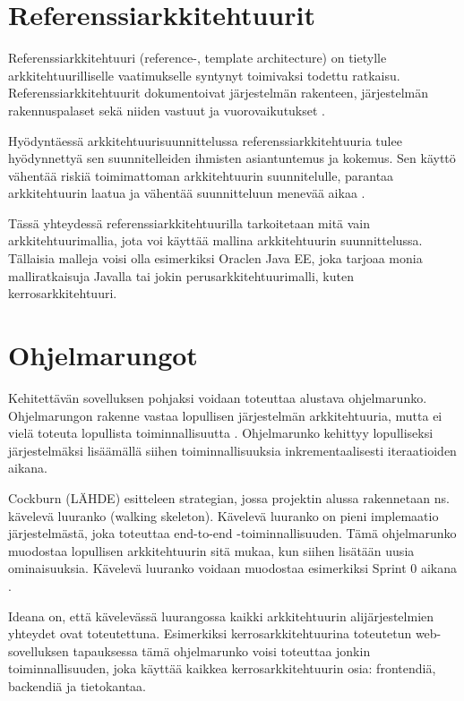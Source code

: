 \section{Referenssiarkkitehtuurit}
Referenssiarkkitehtuuri (reference-, template architecture) on tietylle arkkitehtuurilliselle vaatimukselle syntynyt toimivaksi todettu ratkaisu. Referenssiarkkitehtuurit dokumentoivat järjestelmän rakenteen, järjestelmän rakennuspalaset sekä niiden vastuut ja vuorovaikutukset \citep{vogel2011software}. 

Hyödyntäessä arkkitehtuurisuunnittelussa referenssiarkkitehtuuria tulee hyödynnettyä sen suunnitelleiden ihmisten asiantuntemus ja kokemus. Sen käyttö vähentää riskiä toimimattoman arkkitehtuurin suunnitelulle, parantaa arkkitehtuurin laatua ja vähentää suunnitteluun menevää aikaa \citep{vogel2011software}.

Tässä yhteydessä referenssiarkkitehtuurilla tarkoitetaan mitä vain arkkitehtuurimallia, jota voi käyttää mallina arkkitehtuurin suunnittelussa. Tällaisia malleja voisi olla esimerkiksi Oraclen Java EE, joka tarjoaa monia malliratkaisuja Javalla tai jokin perusarkkitehtuurimalli, kuten kerrosarkkitehtuuri.

\section{Ohjelmarungot}
Kehitettävän sovelluksen pohjaksi voidaan toteuttaa alustava ohjelmarunko. Ohjelmarungon rakenne vastaa lopullisen järjestelmän arkkitehtuuria, mutta ei vielä toteuta lopullista toiminnallisuutta \citep{vogel2011software}. Ohjelmarunko kehittyy lopulliseksi järjestelmäksi lisäämällä siihen toiminnallisuuksia inkrementaalisesti iteraatioiden aikana.

Cockburn (LÄHDE) esitteleen strategian, jossa projektin alussa rakennetaan ns. kävelevä luuranko (walking skeleton). Kävelevä luuranko on pieni implemaatio järjestelmästä, joka toteuttaa end-to-end -toiminnallisuuden. Tämä ohjelmarunko muodostaa lopullisen arkkitehtuurin sitä mukaa, kun siihen lisätään uusia ominaisuuksia. Kävelevä luuranko voidaan muodostaa esimerkiksi Sprint 0 aikana \citep{eloranta2015techniques}.

Ideana on, että kävelevässä luurangossa kaikki arkkitehtuurin alijärjestelmien yhteydet ovat toteutettuna. Esimerkiksi kerrosarkkitehtuurina toteutetun web-sovelluksen tapauksessa tämä ohjelmarunko voisi toteuttaa jonkin toiminnallisuuden, joka käyttää kaikkea kerrosarkkitehtuurin osia: frontendiä, backendiä ja tietokantaa.

